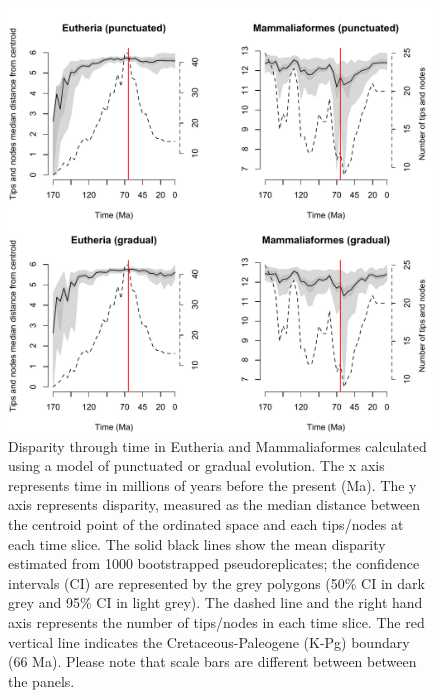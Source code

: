 \documentclass[12pt,letterpaper]{article}
\begin{document}
\begin{figure}[!htbp]
\centering
    \includegraphics[keepaspectratio=true]{Figures/Main_results.pdf}
\caption{Disparity through time in Eutheria and Mammaliaformes calculated using a model of punctuated or gradual evolution. The x axis represents time in millions of years before the present (Ma). The y axis represents disparity, measured as the median distance between the centroid point of the ordinated space and each tips/nodes at each time slice. The solid black lines show the mean disparity estimated from 1000 bootstrapped pseudoreplicates; the confidence intervals (CI) are represented by the grey polygons (50\% CI in dark grey and 95\% CI in light grey). The dashed line and the right hand axis represents the number of tips/nodes in each time slice. The red vertical line indicates the Cretaceous-Paleogene (K-Pg) boundary (66 Ma). Please note that scale bars are different between between the panels.}
\label{fig:Fig_Raw_results}
\end{figure}
\end{document}
